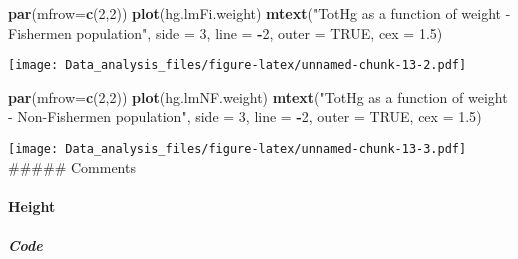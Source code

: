 \documentclass[12pt,]{article}
\newenvironment{Shaded}{\begin{snugshade}}{\end{snugshade}}
\newcommand{\KeywordTok}[1]{\textcolor[rgb]{0.13,0.29,0.53}{\textbf{#1}}}
\newcommand{\DataTypeTok}[1]{\textcolor[rgb]{0.13,0.29,0.53}{#1}}
\newcommand{\DecValTok}[1]{\textcolor[rgb]{0.00,0.00,0.81}{#1}}
\newcommand{\FloatTok}[1]{\textcolor[rgb]{0.00,0.00,0.81}{#1}}
\newcommand{\StringTok}[1]{\textcolor[rgb]{0.31,0.60,0.02}{#1}}
\newcommand{\OtherTok}[1]{\textcolor[rgb]{0.56,0.35,0.01}{#1}}
\newcommand{\OperatorTok}[1]{\textcolor[rgb]{0.81,0.36,0.00}{\textbf{#1}}}
\newcommand{\NormalTok}[1]{#1}
\let\oldparagraph\paragraph
\renewcommand{\paragraph}[1]{\oldparagraph{#1}\mbox{}}
\let\oldsubparagraph\subparagraph
\renewcommand{\subparagraph}[1]{\oldsubparagraph{#1}\mbox{}}
\begin{document}
\begin{Shaded}
\begin{Highlighting}[]
\KeywordTok{par}\NormalTok{(}\DataTypeTok{mfrow=}\KeywordTok{c}\NormalTok{(}\DecValTok{2}\NormalTok{,}\DecValTok{2}\NormalTok{))}
\KeywordTok{plot}\NormalTok{(hg.lmFi.weight)}
\KeywordTok{mtext}\NormalTok{(}\StringTok{"TotHg as a function of weight - Fishermen population"}\NormalTok{, }\DataTypeTok{side =} \DecValTok{3}\NormalTok{, }\DataTypeTok{line =} \OperatorTok{-}\DecValTok{2}\NormalTok{, }\DataTypeTok{outer =} \OtherTok{TRUE}\NormalTok{, }\DataTypeTok{cex =} \FloatTok{1.5}\NormalTok{)}
\end{Highlighting}
\end{Shaded}

\texttt{[image: Data\_analysis\_files/figure-latex/unnamed-chunk-13-2.pdf]}

\begin{Shaded}
\begin{Highlighting}[]
\KeywordTok{par}\NormalTok{(}\DataTypeTok{mfrow=}\KeywordTok{c}\NormalTok{(}\DecValTok{2}\NormalTok{,}\DecValTok{2}\NormalTok{))}
\KeywordTok{plot}\NormalTok{(hg.lmNF.weight)}
\KeywordTok{mtext}\NormalTok{(}\StringTok{"TotHg as a function of weight - Non-Fishermen population"}\NormalTok{, }\DataTypeTok{side =} \DecValTok{3}\NormalTok{, }\DataTypeTok{line =} \OperatorTok{-}\DecValTok{2}\NormalTok{, }\DataTypeTok{outer =} \OtherTok{TRUE}\NormalTok{, }\DataTypeTok{cex =} \FloatTok{1.5}\NormalTok{)}
\end{Highlighting}
\end{Shaded}

\texttt{[image: Data\_analysis\_files/figure-latex/unnamed-chunk-13-3.pdf]}
\#\#\#\#\# Comments

\paragraph{Height}\label{height}

\subparagraph{Code}\label{code-3}
\end{document}
